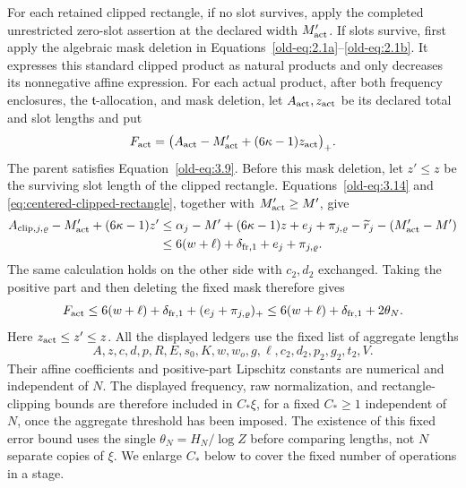 \documentclass[11pt,a4paper]{article}
\numberwithin{equation}{section}
\numberwithin{figure}{section}
\theoremstyle{definition}
\theoremstyle{remark}
\begin{document}
For each retained clipped rectangle, if no slot survives, apply the
completed unrestricted zero-slot assertion at the declared width
\(M'_{\rm act}\).  If slots survive, first apply the algebraic mask deletion in
Equations~\eqref{old-eq:2.1a}--\eqref{old-eq:2.1b}.
It expresses this standard clipped product as natural products and only
decreases its nonnegative affine expression.  For each actual product, after both frequency
enclosures, the \(\mathfrak t\)-allocation, and mask deletion, let
\(A_{\rm act},z_{\rm act}\) be its declared total and slot lengths
and put
\[
 F_{\rm act}
 =\bigl(A_{\rm act}-M'_{\rm act}+(6\kappa-1)z_{\rm act}\bigr)_+.
\]
The parent satisfies Equation~\eqref{old-eq:3.9}.  Before this mask
deletion, let \(z'\le z\) be the surviving slot length of the clipped
rectangle.  Equations~\eqref{old-eq:3.14} and
\eqref{eq:centered-clipped-rectangle}, together with \(M'_{\rm act}\ge M'\), give
\[
 \begin{split}
 A_{{\rm clip},j,\varrho}-M'_{\rm act}+(6\kappa-1)z'
 &\le \alpha_j-M'+(6\kappa-1)z
       +e_j+\pi_{j,\varrho}-\widetilde r_j-(M'_{\rm act}-M')\\
 &\le6(w+\ell)+\delta_{{\rm fr},1}+e_j+\pi_{j,\varrho}.
 \end{split}
\]
The same calculation holds on the other side with \(c_2,d_2\) exchanged.
Taking the positive part and then deleting the fixed mask therefore gives
\[
 F_{\rm act}\le6(w+\ell)+\delta_{{\rm fr},1}
                 +(e_j+\pi_{j,\varrho})_+
 \le6(w+\ell)+\delta_{{\rm fr},1}+2\theta_N.
\]
Here \(z_{\rm act}\le z'\le z\).  All the displayed ledgers use the fixed list
of aggregate lengths
\[
 A,z,c,d,p,R,E,s_0,K,w,w_o,g,\ell,c_2,d_2,p_2,g_2,t_2,V.
\]
Their affine coefficients and positive-part Lipschitz constants are
numerical and independent of \(N\).  The displayed frequency, raw
normalization, and rectangle-clipping bounds are therefore included in
\(C_*\xi\), for a fixed \(C_*\ge1\) independent of \(N\), once the
aggregate threshold has been imposed.  The existence of this fixed error bound uses the single
\(\theta_N=H_N/\log Z\) before comparing lengths, not \(N\) separate
copies of \(\xi\).  We enlarge \(C_*\) below to cover the fixed number
of operations in a stage.
\end{document}
